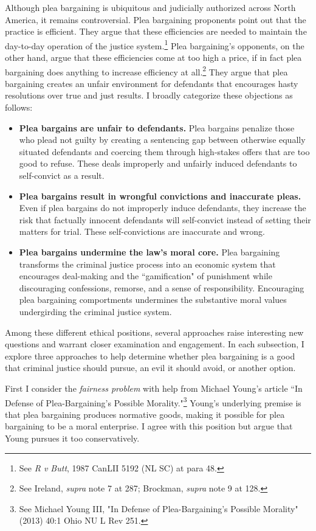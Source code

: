 Although plea bargaining is ubiquitous and judicially authorized across North America, it remains controversial. Plea bargaining proponents point out that the practice is efficient. They argue that these efficiencies are needed to maintain the day-to-day operation of the justice system.\footnote{See \textit{R v Butt}, 1987 CanLII 5192 (NL SC) at para 48.} Plea bargaining's opponents, on the other hand, argue that these efficiencies come at too high a price, if in fact plea bargaining does anything to increase efficiency at all.\footnote{See Ireland, \textit{supra} note 7 at 287; Brockman, \textit{supra} note 9 at 128.} They argue that plea bargaining creates an unfair environment for defendants that encourages hasty resolutions over true and just results. I broadly categorize these objections as follows:

\begin{itemize}
    \item \textbf{Plea bargains are unfair to defendants.} Plea bargains penalize those who plead not guilty by creating a sentencing gap between otherwise equally situated defendants and coercing them through high-stakes offers that are too good to refuse. These deals improperly and unfairly induced defendants to self-convict as a result.
    \item \textbf{Plea bargains result in wrongful convictions and inaccurate pleas.} Even if plea bargains do not improperly induce defendants, they increase the risk that factually innocent defendants will self-convict instead of setting their matters for trial. These self-convictions are inaccurate and wrong.
    \item \textbf{Plea bargains undermine the law's moral core.} Plea bargaining transforms the criminal justice process into an economic system that encourages deal-making and the ``gamification" of punishment while discouraging confessions, remorse, and a sense of responsibility. Encouraging plea bargaining comportments undermines the substantive moral values undergirding the criminal justice system.
\end{itemize}
Among these different ethical positions, several approaches raise interesting new questions and warrant closer examination and engagement. In each subsection, I explore three approaches to help determine whether plea bargaining is a good that criminal justice should pursue, an evil it should avoid, or another option. 

First I consider the \textit{fairness problem} with help from Michael Young's article ``In Defense of Plea-Bargaining's Possible Morality."\footnote{See Michael Young III, "In Defense of Plea-Bargaining's Possible Morality" (2013) 40:1 Ohio NU L Rev 251.} Young's underlying premise is that plea bargaining produces normative goods, making it possible for plea bargaining to be a moral enterprise. I agree with this position but argue that Young pursues it too conservatively. 

